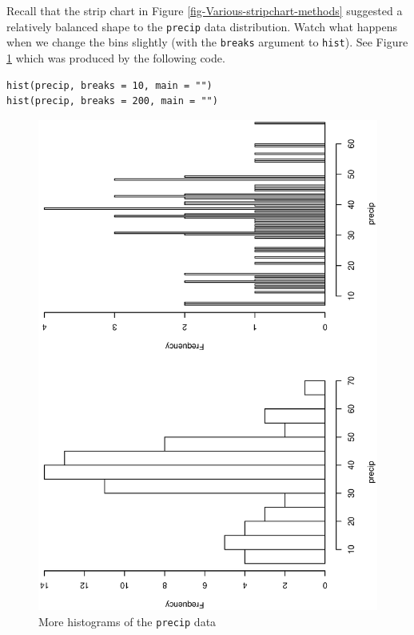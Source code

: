 \documentclass[captions=tableheading]{scrbook}
\begin{document}
\begin{example}
Recall that the strip chart in Figure \ref{fig-Various-stripchart-methods} suggested a relatively balanced shape to the \texttt{precip} data distribution. Watch what happens when we change the bins slightly (with the \texttt{breaks} argument to \texttt{hist}). See Figure \ref{fig-histograms-bins} which was produced by the following code.



\begin{verbatim}
hist(precip, breaks = 10, main = "")
hist(precip, breaks = 200, main = "")
\end{verbatim}







\begin{figure}[th]
  \includegraphics[angle=270, totalheight=4in]{ps/datadesc/histograms-bins.ps}
  \caption{More histograms of the \texttt{precip} data}
  \label{fig-histograms-bins}
\end{figure}



\end{example}
\end{document}
